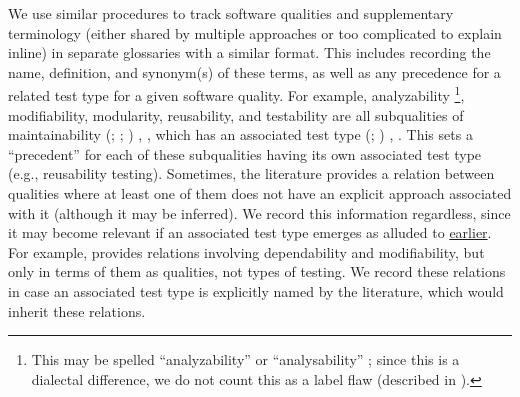 \label{qual-supp-procedure}
We use similar procedures to track software qualities and supplementary
terminology (either shared by multiple approaches or too complicated to explain
inline) in separate glossaries with a similar format. This includes recording
the name, definition, and synonym(s) of these terms, as well as any precedence
for a related test type for a given software quality. For example, analyzability%
\footnote{This may be spelled ``analyzability'' \citep[p.~18]{IEEE2017} or
    ``analysability'' \citep{ISO_IEC2023a}; since this is a dialectal
    difference, we do not count this as a label flaw (described in
    ).}, modifiability, modularity, reusability, and
testability are all subqualities of maintainability \ifnotpaper
    (\citealp{ISO_IEC2023a}; \citealp[Tab.~A.1]{IEEE2021};
    \citealp[p.~7\=/10]{SWEBOK2024}) \else
    \cite[p.~7\=/10]{SWEBOK2024}, \cite[Tab.~A.1]{IEEE2021},
    \cite{ISO_IEC2023a} \fi which has an associated test type
\ifnotpaper
    (\citealp[pp.~5, 22]{IEEE2022}; \citeyear[p.~38, Tab.~A.1]{IEEE2021})\else
    \cite[pp.~5, 22]{IEEE2022}, \cite[p.~38, Tab.~A.1]{IEEE2021}\fi. This sets
a ``precedent'' for each of these subqualities having its own associated test
type (e.g., reusability testing). \ifnotpaper
    Sometimes, the literature provides a relation between qualities where at
    least one of them does not have an explicit approach associated with it
    (although it may be inferred). We record this information regardless, since
    it may become relevant if an associated test type emerges as alluded to
    \hyperref[qual-types]{earlier}. For example, \citet{ISO_IEC2023a} provides
    relations involving dependability and modifiability, but only in terms of
    them as qualities, not types of testing. We record these relations in case
    an associated test type is explicitly named by the literature, which would
    inherit these relations. \fi


